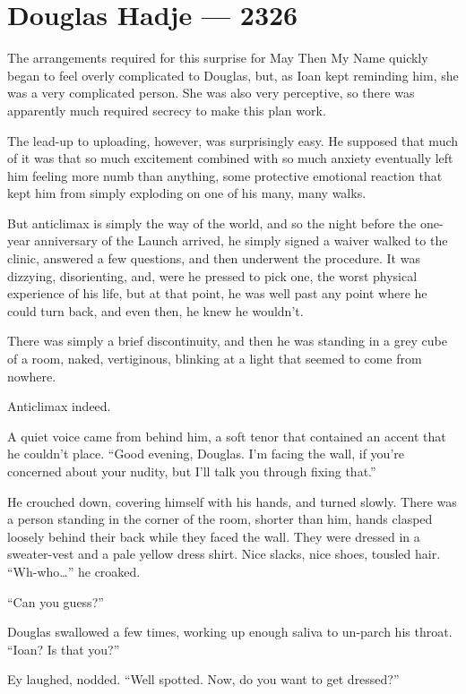 \hypertarget{douglas-hadje-2326}{%
\chapter{Douglas Hadje — 2326}\label{douglas-hadje-2326}}

The arrangements required for this surprise for May Then My Name quickly began to feel overly complicated to Douglas, but, as Ioan kept reminding him, she was a very complicated person. She was also very perceptive, so there was apparently much required secrecy to make this plan work.

The lead-up to uploading, however, was surprisingly easy. He supposed that much of it was that so much excitement combined with so much anxiety eventually left him feeling more numb than anything, some protective emotional reaction that kept him from simply exploding on one of his many, many walks.

But anticlimax is simply the way of the world, and so the night before the one-year anniversary of the Launch arrived, he simply signed a waiver walked to the clinic, answered a few questions, and then underwent the procedure. It was dizzying, disorienting, and, were he pressed to pick one, the worst physical experience of his life, but at that point, he was well past any point where he could turn back, and even then, he knew he wouldn't.

There was simply a brief discontinuity, and then he was standing in a grey cube of a room, naked, vertiginous, blinking at a light that seemed to come from nowhere.

Anticlimax indeed.

A quiet voice came from behind him, a soft tenor that contained an accent that he couldn't place. ``Good evening, Douglas. I'm facing the wall, if you're concerned about your nudity, but I'll talk you through fixing that.''

He crouched down, covering himself with his hands, and turned slowly. There was a person standing in the corner of the room, shorter than him, hands clasped loosely behind their back while they faced the wall. They were dressed in a sweater-vest and a pale yellow dress shirt. Nice slacks, nice shoes, tousled hair. ``Wh-who\ldots{}'' he croaked.

``Can you guess?''

Douglas swallowed a few times, working up enough saliva to un-parch his throat. ``Ioan? Is that you?''

Ey laughed, nodded. ``Well spotted. Now, do you want to get dressed?''

